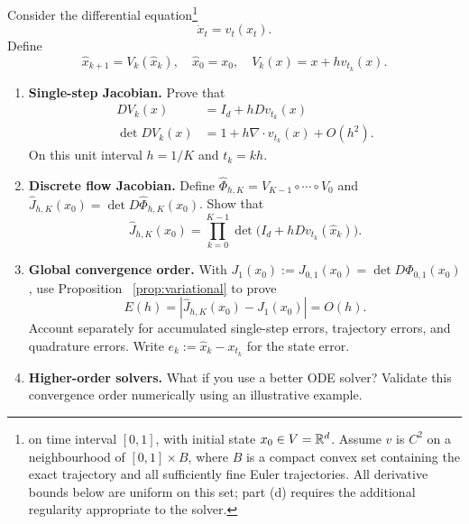 \documentclass[12pt,a4paper,oneside]{book}
\begin{document}
\begin{Question}
Consider the differential equation\footnote{on time interval $[0,1]$, with initial state $x_0\in V=\mathbb{R}^d$. Assume $v$ is
$C^2$ on a neighbourhood of $[0,1]\times B$, where $B$ is a compact convex set containing the exact trajectory and all
sufficiently fine Euler trajectories. All derivative bounds below are uniform on this set; part (d) requires the additional
regularity appropriate to the solver.}
\begin{equation*}
    \dot x_t=v_t(x_t).
\end{equation*}
Define
\begin{equation*}
    \widehat x_{k+1}=V_k(\widehat x_k),\quad \widehat x_0=x_0,\quad V_k(x)=x+h v_{t_k}(x).
\end{equation*}

\begin{enumerate}[label=(\alph*)]
    \item \textbf{Single-step Jacobian.} Prove that
        \begin{equation*}
            \begin{aligned}
                DV_k(x) &= I_d+hDv_{t_k}(x) \\
                \det DV_k(x) &= 1+h\nabla\cdot v_{t_k}(x)+O(h^2).
            \end{aligned}
        \end{equation*}
        On this unit interval $h=1/K$ and $t_k=kh$.
    \item \textbf{Discrete flow Jacobian.} Define $\widehat\Phi_{h,K}=V_{K-1}\circ\cdots\circ V_0$ and
        $\widehat J_{h,K}(x_0)=\det D\widehat\Phi_{h,K}(x_0)$. Show that
        \begin{equation*}
            \widehat J_{h,K}(x_0)=\prod_{k=0}^{K-1} \det\bigl(I_d+hDv_{t_k}(\widehat x_k)\bigr).
        \end{equation*}

    \item \textbf{Global convergence order.} With $J_1(x_0):=J_{0,1}(x_0)=\det D\Phi_{0,1}(x_0)$, use Proposition
        ~\ref{prop:variational} to prove
        \begin{equation*}
            E(h)=|\widehat J_{h,K}(x_0)-J_1(x_0)|=O(h).
        \end{equation*}
        Account separately for accumulated single-step errors, trajectory errors, and quadrature errors. Write $e_k:=\widehat x_k-x_{t_k}$
        for the state error.

    \item \textbf{Higher-order solvers.} What if you use a better ODE solver? Validate this convergence order numerically
        using an illustrative example.
\end{enumerate}
\end{Question}
\end{document}
